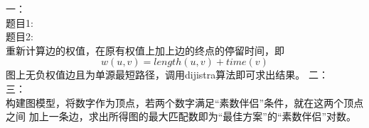 \documentclass{article}
\begin{document}
一：\\
题目1:\\
题目2:\\
重新计算边的权值，在原有权值上加上边的终点的停留时间，即
\[
w(u, v) = length(u, v) + time(v)
\]
图上无负权值边且为单源最短路径，调用dijistra算法即可求出结果。
\newpage
二：\\



\newpage
三：\\
构建图模型，将数字作为顶点，若两个数字满足“素数伴侣”条件，就在这两个顶点之间
加上一条边，求出所得图的最大匹配数即为“最佳方案”的“素数伴侣”对数。
\end{document}
